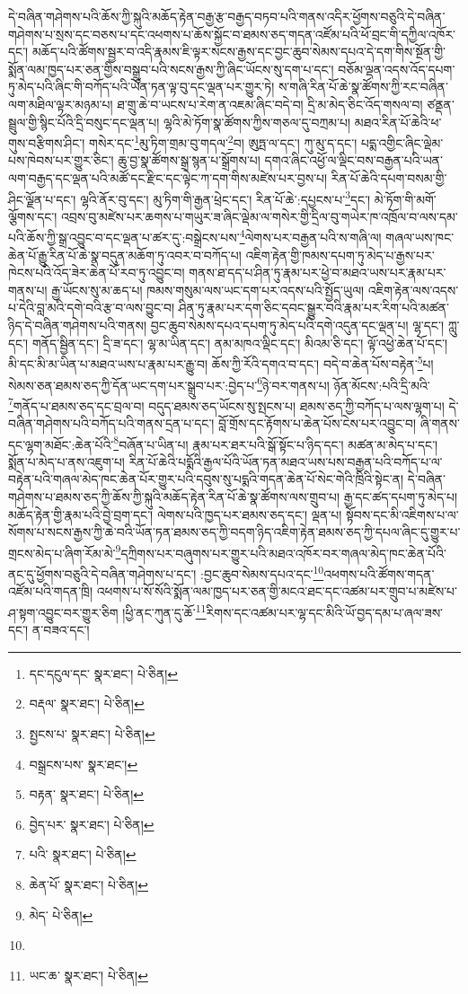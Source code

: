 དེ་བཞིན་གཤེགས་པའི་ཆོས་ཀྱི་སྐུའི་མཆོད་རྟེན་བརྒྱ་རྩ་བརྒྱད་བཏབ་པའི་གནས་འདིར་ཕྱོགས་བཅུའི་དེ་བཞིན་གཤེགས་པ་སྲས་དང་བཅས་པ་དང་འཕགས་པ་ཆོས་སྐྱོང་བ་ཐམས་ཅད་གདན་འཛོམ་པའི་ཕོ་བྲང་གི་དཀྱིལ་འཁོར་དང་། མཆོད་པའི་ཚོགས་སྦྱར་བ་འདི་རྣམས་ཇི་ལྟར་སངས་རྒྱས་དང་བྱང་ཆུབ་སེམས་དཔའ་དེ་དག་གིས་སྔོན་གྱི་སྨོན་ལམ་ཁྱད་པར་ཅན་གྱིས་བསྒྲུབ་པའི་སངས་རྒྱས་ཀྱི་ཞིང་ཡོངས་སུ་དག་པ་དང་། བཅོམ་ལྡན་འདས་འོད་དཔག་ཏུ་མེད་པའི་ཞིང་གི་བཀོད་པའི་ཡོན་ཏན་ལྟ་བུ་དང་ལྡན་པར་གྱུར་ཏེ། ས་གཞི་རིན་པོ་ཆེ་སྣ་ཚོགས་ཀྱི་རང་བཞིན་ལག་མཐིལ་ལྟར་མཉམ་པ། ཐ་གྲུ་ཆེ་བ་ཡངས་པ་རེག་ན་འཇམ་ཞིང་བདེ་བ། དྲི་མ་མེད་ཅིང་འོད་གསལ་བ། ཙནྡན་སྦྲུལ་གྱི་སྙིང་པོའི་དྲི་བསུང་དང་ལྡན་པ། ལྷའི་མེ་ཏོག་སྣ་ཚོགས་ཀྱིས་གཅལ་དུ་བཀྲམ་པ། མཐའ་རིན་པོ་ཆེའི་ཕ་གུས་བརྩིགས་ཤིང་། གསེར་དང་\footnote{དང་དངུལ་དང་  སྣར་ཐང་།  པེ་ཅིན། }མུ་ཏིག་གྲམ་བུ་གདལ་\footnote{བརྡལ་  སྣར་ཐང་།  པེ་ཅིན། }བ། ཨུཏྤ་ལ་དང་། ཀུ་མུ་ད་དང་། པདྨ་འགྱིང་ཞིང་ལྡེམ་པས་ཁེབས་པར་གྱུར་ཅིང་། ཆུ་བྱ་སྣ་ཚོགས་སྒྲ་སྙན་པ་སྒྲོགས་པ། དགའ་ཞིང་འཕྱོ་ལ་ལྡིང་བས་བརྒྱན་པའི་ཡན་ལག་བརྒྱད་དང་ལྡན་པའི་མཚོ་དང་རྫིང་དང་ལྟེང་ཀ་དག་གིས་མཛེས་པར་བྱས་པ། རིན་པོ་ཆེའི་དཔག་བསམ་གྱི་ཤིང་ལྗོན་པ་དང་། ལྷའི་ནོར་བུ་དང་། མུ་ཏིག་གི་རྒྱན་ཕྲེང་དང་། རིན་པོ་ཆེ་:དཔྱངས་པ་\footnote{སྤྱངས་པ་  སྣར་ཐང་།  པེ་ཅིན། }དང་། མེ་ཏོག་གི་མགོ་ལྕོགས་དང་། འབྲས་བུ་མཛེས་པར་ཆགས་པ་གཡུར་ཟ་ཞིང་ལྡེམ་ལ་གསེར་གྱི་དྲིལ་བུ་གཡེར་ཁ་འཁྲོལ་བ་ལས་དམ་པའི་ཆོས་ཀྱི་སྒྲ་འབྱུང་བ་དང་ལྡན་པ་ཚར་དུ་:བསྒྲེངས་པས་\footnote{བསྒྲངས་པས་  སྣར་ཐང་། }ལེགས་པར་བརྒྱན་པའི་ས་གཞི་ལ། གཞལ་ཡས་ཁང་ཆེན་པོ་རྒྱུ་རིན་པོ་ཆེ་སྣ་བདུན་མཆོག་ཏུ་འབར་བ་བཀོད་པ། འཇིག་རྟེན་གྱི་ཁམས་དཔག་ཏུ་མེད་པ་རྒྱས་པར་ཁེངས་པའི་འོད་ཟེར་ཆེན་པོ་རབ་ཏུ་འབྱུང་བ། གནས་ཐ་དད་པ་ཤིན་ཏུ་རྣམ་པར་ཕྱེ་བ་མཐའ་ཡས་པར་རྣམ་པར་གནས་པ། རྒྱ་ཡོངས་སུ་མ་ཆད་པ། ཁམས་གསུམ་ལས་ཡང་དག་པར་འདས་པའི་སྤྱོད་ཡུལ། འཇིག་རྟེན་ལས་འདས་པ་དེའི་བླ་མའི་དགེ་བའི་རྩ་བ་ལས་བྱུང་བ། ཤིན་ཏུ་རྣམ་པར་དག་ཅིང་དབང་སྒྱུར་བའི་རྣམ་པར་རིག་པའི་མཚན་ཉིད་དེ་བཞིན་གཤེགས་པའི་གནས། བྱང་ཆུབ་སེམས་དཔའ་དཔག་ཏུ་མེད་པའི་དགེ་འདུན་དང་ལྡན་པ། ལྷ་དང་། ཀླུ་དང་། གནོད་སྦྱིན་དང་། དྲི་ཟ་དང་། ལྷ་མ་ཡིན་དང་། ནམ་མཁའ་ལྡིང་དང་། མིའམ་ཅི་དང་། ལྟོ་འཕྱེ་ཆེན་པོ་དང་། མི་དང་མི་མ་ཡིན་པ་མཐའ་ཡས་པ་རྣམ་པར་རྒྱུ་བ། ཆོས་ཀྱི་རོའི་དགའ་བ་དང་། བདེ་བ་ཆེན་པོས་བརྟེན་\footnote{བརྟན་  སྣར་ཐང་།  པེ་ཅིན། }པ། སེམས་ཅན་ཐམས་ཅད་ཀྱི་དོན་ཡང་དག་པར་སྒྲུབ་པར་:བྱེད་པ་\footnote{བྱེད་པར་  སྣར་ཐང་།  པེ་ཅིན། }ཉེ་བར་གནས་པ། ཉོན་མོངས་:པའི་དྲི་མའི་\footnote{པའི་  སྣར་ཐང་།  པེ་ཅིན། }གནོད་པ་ཐམས་ཅད་དང་བྲལ་བ། བདུད་ཐམས་ཅད་ཡོངས་སུ་སྤངས་པ། ཐམས་ཅད་ཀྱི་བཀོད་པ་ལས་ལྷག་པ། དེ་བཞིན་གཤེགས་པའི་བཀོད་པའི་གནས་དྲན་པ་དང་། བློ་གྲོས་དང་རྟོགས་པ་ཆེན་པོས་ངེས་པར་འབྱུང་བ། ཞི་གནས་དང་ལྷག་མཐོང་:ཆེན་པོའི་\footnote{ཆེན་པོ་  སྣར་ཐང་།  པེ་ཅིན། }བཞོན་པ་ཡིན་པ། རྣམ་པར་ཐར་པའི་སྒོ་སྟོང་པ་ཉིད་དང་། མཚན་མ་མེད་པ་དང་། སྨོན་པ་མེད་པ་ནས་འཇུག་པ། རིན་པོ་ཆེའི་པདྨོའི་རྒྱལ་པོའི་ཡོན་ཏན་མཐའ་ཡས་པས་བརྒྱན་པའི་བཀོད་པ་ལ་བརྟེན་པའི་གཞལ་མེད་ཁང་ཆེན་པོར་གྱུར་པའི་དབུས་སུ་པདྨའི་གདན་ཆེན་པོ་སེང་གེའི་ཁྲིའི་སྟེང་ན། དེ་བཞིན་གཤེགས་པ་ཐམས་ཅད་ཀྱི་ཆོས་ཀྱི་སྐུའི་མཆོད་རྟེན་རིན་པོ་ཆེ་སྣ་ཚོགས་ལས་གྲུབ་པ། རྒྱ་དང་ཚད་དཔག་ཏུ་མེད་པ། མཆོད་རྟེན་གྱི་རྣམ་པའི་བྱེ་བྲག་དང་། ལེགས་པའི་ཁྱད་པར་ཐམས་ཅད་དང་། ལྡན་པ། སྟོབས་དང་མི་འཇིགས་པ་ལ་སོགས་པ་སངས་རྒྱས་ཀྱི་ཆེ་བའི་ཡོན་ཏན་ཐམས་ཅད་ཀྱི་བདག་ཉིད་འཇིག་རྟེན་ཐམས་ཅད་ཀྱི་དཔལ་ཞིང་དུ་གྱུར་པ་གྲངས་མེད་པ་ཞིག་རོམ་མེ་\footnote{མེད་  པེ་ཅིན། }དཀྲིགས་པར་བཞུགས་པར་གྱུར་པའི་མཐའ་འཁོར་བར་གཞལ་མེད་ཁང་ཆེན་པོའི་ནང་དུ་ཕྱོགས་བཅུའི་དེ་བཞིན་གཤེགས་པ་དང་། :བྱང་ཆུབ་སེམས་དཔའ་དང་\footnote{}འཕགས་པའི་ཚོགས་གདན་འཛོམ་པའི་གདན་ཁྲི། འཕགས་པ་སོ་སོའི་སྨོན་ལམ་ཁྱད་པར་ཅན་གྱི་མངའ་ཐང་དང་འཚམ་པར་གྲུབ་པ་མཛེས་པ་ཤ་སྟག་འབྱུང་བར་གྱུར་ཅིག །ཕྱི་ནང་ཀུན་དུ་ཆོ་\footnote{ཡང་ཆ་  སྣར་ཐང་།  པེ་ཅིན། }རིགས་དང་འཚམ་པར་ལྷ་དང་མིའི་ཡོ་བྱད་དམ་པ་ཞལ་ཟས་དང་། ན་བཟའ་དང་། 